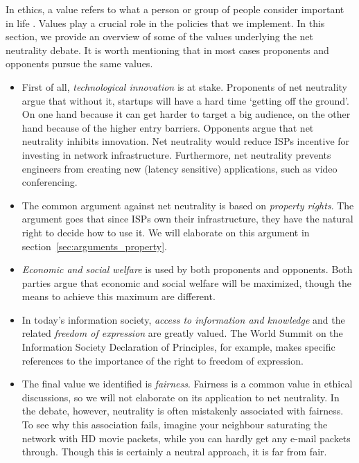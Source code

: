 
In ethics, a value refers to what a person or group of people consider important in life \cite{friedman2006value}. Values play a crucial role in the policies that we implement. In this section, we provide an overview of some of the values underlying the net neutrality debate. It is worth mentioning that in most cases proponents and opponents pursue the same values.

\begin{itemize}
\item First of all, \emph{technological innovation} is at stake. Proponents of net neutrality argue that without it, startups will have a hard time `getting off the ground'. On one hand because it can get harder to target a big audience, on the other hand because of the higher entry barriers. Opponents argue that net neutrality inhibits innovation. Net neutrality would reduce \acp{ISP} incentive for investing in network infrastructure. Furthermore, net neutrality prevents engineers from creating new (latency sensitive) applications, such as video conferencing.

\item The common argument against net neutrality is based on \emph{property rights}. The argument goes that since \acp{ISP} own their infrastructure, they have the natural right to decide how to use it. We will elaborate on this argument in section~\ref{sec:arguments_property}.

\item \emph{Economic and social welfare} is used by both proponents and opponents. Both parties argue that economic and social welfare will be maximized, though the means to achieve this maximum are different.

\item In today's information society, \emph{access to information and knowledge} and the related \emph{freedom of expression} are greatly valued. The World Summit on the Information Society Declaration of Principles, for example, makes specific references to the importance of the right to freedom of expression.

\item The final value we identified is \emph{fairness}. Fairness is a common value in ethical discussions, so we will not elaborate on its application to net neutrality. In the debate, however, neutrality is often mistakenly associated with fairness. To see why this association fails, imagine your neighbour saturating the network with HD movie packets, while you can hardly get any e-mail packets through. Though this is certainly a neutral approach, it is far from fair.
\end{itemize}